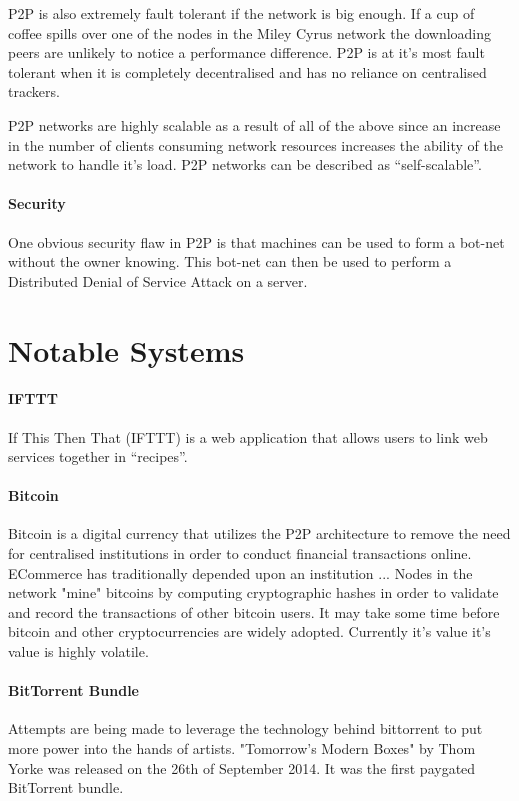\documentclass[11pt]{amsart}
\begin{document}
\indent P2P is also extremely fault tolerant if the network is big enough. If a cup of coffee spills over one of the nodes in the Miley Cyrus network the downloading peers are unlikely to notice a performance difference.
P2P is at it's most fault tolerant when it is completely decentralised and has no reliance on centralised trackers.

\indent P2P networks are highly scalable as a result of all of the above since an increase in the number of clients consuming network resources increases the ability of the network to handle it's load. P2P networks can be described as ``self-scalable''.

\subsection{Security}

One obvious security flaw in P2P is that machines can be used to form a bot-net without the owner knowing. This bot-net can then be used to perform a Distributed Denial of Service Attack on a server.

\part{Notable Systems}

\subsection{IFTTT}
If This Then That (IFTTT) is a web application that allows users to link web services together in ``recipes''.
\subsection{Bitcoin} 

Bitcoin is a digital currency that utilizes the P2P architecture to remove the need for centralised institutions in order to conduct financial transactions online. ECommerce has traditionally depended upon an institution ... 
Nodes in the network "mine" bitcoins by computing cryptographic hashes in order to validate and record the transactions of other bitcoin users. It may take some time before bitcoin and other cryptocurrencies are widely adopted. Currently it's value it's value is highly volatile.

\subsection{BitTorrent Bundle}
Attempts are being made to leverage the technology behind bittorrent to put more power into the hands of artists. "Tomorrow's Modern Boxes" by Thom Yorke was released on the 26th of September 2014. It was the first paygated BitTorrent bundle.
\end{document}
